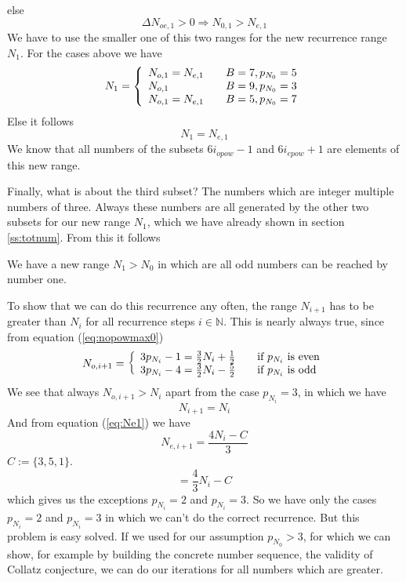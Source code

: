 \documentclass{aomart}
\theoremstyle{definition}
\begin{document}
else
\begin{equation} \Delta N_{oe,1} > 0 \Rightarrow N_{0,1} > N_{e,1} \label{eq:deltaone1pos} \end{equation}
We have to use the smaller one of this two ranges for the new recurrence range $N_{1}$. For the cases above we have
\begin{equation} N_{1} = \left\{
	\begin{array}{l@{\quad \quad}l}
	N_{o,1} = N_{e,1} & B=7, p_{N_{0}}=5 \\
	N_{o,1} & B=9, p_{N_{0}}=3 \\
	N_{o,1} = N_{e,1} & B=5, p_{N_{0}}=7  
\end{array}
\right. \label{eq:n1cases}\end{equation} 	
Else it follows
\begin{equation}\label{eq:N}
	N_{1} = N_{e,1}
\end{equation}
We know that all numbers of the subsets $6i_{opow}-1$ and $6i_{epow}+1$ are elements of this new range.

Finally, what is about the third subset? The numbers which are integer multiple numbers of three. Always these numbers are all generated by the other two subsets for our new range $N_{1}$, which we have already shown in section \ref{ss:totnum}. From this it follows
\begin{center}
	We have a new range $N_{1} > N_{0}$ in which are all odd numbers can be reached by number one. 
\end{center}
To show that we can do this recurrence any often, the range $N_{i+1}$ has to be greater than $N_{i}$ for all recurrence steps $i \in \mathbb{N}$. This is nearly always true, since from equation (\ref{eq:nopowmax0}) 
\[ N_{o,i+1} = \left\{
	\begin{array}{l@{\quad \quad}l}
	3p_{N_{i}}-1 = \frac{3}{2}N_{i} + \frac{1}{2} & \textnormal{if $p_{N_{i}}$ is even} \\
	3p_{N_{i}}-4 = \frac{3}{2}N_{i} - \frac{5}{2} & \textnormal{if $p_{N_{i}}$ is odd}
	\end{array}
\right. \] 
We see that always $N_{o,i+1} > N_{i}$ apart from the case $p_{N_{i}} = 3$, in which we have
\[ N_{i+1} = N_{i} \]
And from equation (\ref{eq:Ne1}) we have
\[ N_{e,i+1} = \frac{4N_{i}-C}{3} \]
$C := \{ 3, 5, 1 \}$.
\[ = \frac{4}{3}N_{i} - C \]
which gives us the exceptions $p_{N_{i}} = 2$ and $p_{N_{i}} = 3$. So we have only the cases $p_{N_{i}}=2$ and $p_{N_{i}}=3$ in which we can't do the correct recurrence. But this problem is easy solved. If we used for our assumption $p_{N_{0}} > 3$, for which we can show, for example by building the concrete number sequence, the validity of Collatz conjecture, we can do our iterations for all numbers which are greater. 
\end{document}
